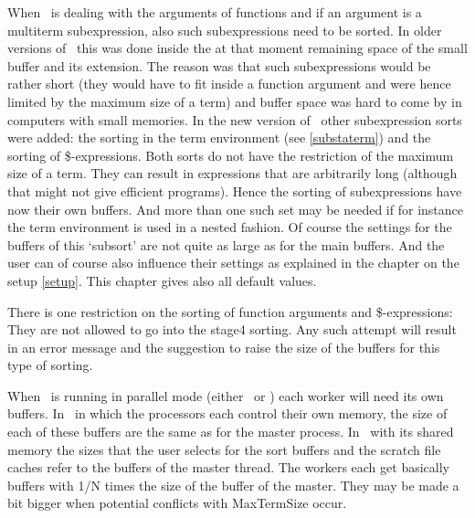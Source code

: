 When \FORM\ is dealing with the arguments of 
functions and if an argument is a multiterm subexpression, also such 
subexpressions need to be sorted. In older versions of \FORM\ this was done 
inside the at that moment remaining space of the small buffer and its 
extension. The reason was that such subexpressions would be rather short 
(they would have to fit inside a function argument and were hence limited 
by the maximum size of a term) and buffer space was hard to come by in 
computers with small memories. In the new version of \FORM\ other 
subexpression sorts were added: the sorting in the term environment (see 
\ref{substaterm}) and the sorting of \$-expressions. Both sorts do not have 
the restriction of the maximum size of a term. They can result in 
expressions that are arbitrarily long (although that might not give 
efficient programs). Hence the sorting of subexpressions have now their own 
buffers. And more than one such set may be needed if for instance the term 
environment is used in a nested fashion. Of course the settings for the 
buffers of this `subsort' are not quite as large as for the main buffers. 
And the user can of course also influence their settings as explained in 
the chapter on the setup \ref{setup}. This chapter gives also all default 
values.

There is one restriction on the sorting of function arguments and 
\$-expressions: They are not allowed to go into the stage4 sorting. Any 
such attempt will result in an error message and the suggestion to raise 
the size of the buffers for this type of sorting.

When \FORM\ is running in parallel mode (either \TFORM\ or \ParFORM) each worker 
will need its own buffers. In \ParFORM\ in which the processors each control 
their own memory, the size of each of these buffers are the same as for the 
master process. In \TFORM\ with its shared memory the sizes that the user 
selects for the sort buffers and the scratch file caches refer to the 
buffers of the master thread. The workers each get basically buffers with 
1/N times the size of the buffer of the master. They may be made a bit 
bigger when potential conflicts with MaxTermSize occur.

